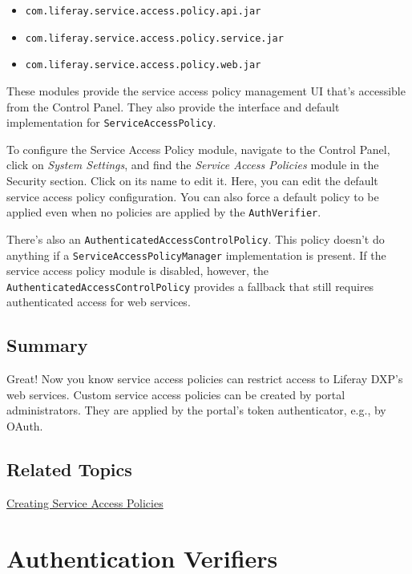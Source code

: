 \begin{itemize}
\tightlist
\item
  \texttt{com.liferay.service.access.policy.api.jar}
\item
  \texttt{com.liferay.service.access.policy.service.jar}
\item
  \texttt{com.liferay.service.access.policy.web.jar}
\end{itemize}

These modules provide the service access policy management UI that's
accessible from the Control Panel. They also provide the interface and
default implementation for \texttt{ServiceAccessPolicy}.

To configure the Service Access Policy module, navigate to the Control
Panel, click on \emph{System Settings}, and find the \emph{Service
Access Policies} module in the Security section. Click on its name to
edit it. Here, you can edit the default service access policy
configuration. You can also force a default policy to be applied even
when no policies are applied by the \texttt{AuthVerifier}.

There's also an \texttt{AuthenticatedAccessControlPolicy}. This policy
doesn't do anything if a \texttt{ServiceAccessPolicyManager}
implementation is present. If the service access policy module is
disabled, however, the \texttt{AuthenticatedAccessControlPolicy}
provides a fallback that still requires authenticated access for web
services.

\section{Summary}\label{summary}

Great! Now you know service access policies can restrict access to
Liferay DXP's web services. Custom service access policies can be
created by portal administrators. They are applied by the portal's token
authenticator, e.g., by OAuth.

\section{Related Topics}\label{related-topics-3}

\href{/docs/7-2/frameworks/-/knowledge_base/f/service-access-policies}{Creating
Service Access Policies}

\chapter{Authentication Verifiers}\label{authentication-verifiers}

